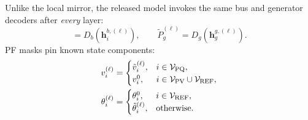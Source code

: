 \documentclass[10pt]{article}
\begin{document}
Unlike the local mirror, the released model invokes the same bus and generator
decoders after \emph{every} layer:
\begin{equation}
 [\tilde v_i^{(\ell)},\tilde\theta_i^{(\ell)}]
 =D_b(\bm h_i^{b,(\ell)}),\qquad
 \tilde P_g^{(\ell)}=D_g(\bm h_g^{g,(\ell)}).
\end{equation}
PF masks pin known state components:
\begin{align}
 v_i^{(\ell)}&=
 \begin{cases}\tilde v_i^{(\ell)},&i\in\mathcal V_{\rm PQ},\\v_i^0,&i\in\mathcal V_{\rm PV}\cup\mathcal V_{\rm REF},\end{cases}\\
 \theta_i^{(\ell)}&=
 \begin{cases}\theta_i^0,&i\in\mathcal V_{\rm REF},\\\tilde\theta_i^{(\ell)},&\text{otherwise}.
 \end{cases}
\end{align}
\end{document}
